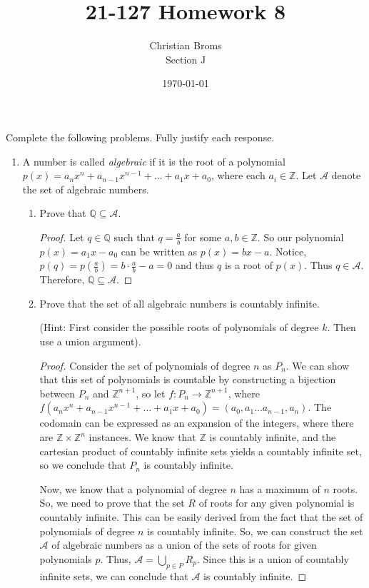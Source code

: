 \documentclass[12pt]{article}
\newcommand{\Z}{\mathbb{Z}}
\newcommand{\Q}{\mathbb{Q}}
\begin{document}
\title{21-127 Homework 8
}
\author{Christian Broms \\ Section J}
\date{\today}
\maketitle
Complete the following problems. Fully justify each response.


\begin{enumerate}

\item A number is called {\it algebraic} if it is the root of a polynomial $p(x)=a_nx^n+a_{n-1}x^{n-1}+\dots+a_1x+a_0$, where each $a_i\in \Z$. Let $\mathcal{A}$ denote the set of algebraic numbers.
\begin{enumerate}
\item Prove that $\Q\subseteq\mathcal{A}$.

\begin{proof}
Let $q \in \Q$ such that $q = \frac{a}{b}$ for some $a, b \in \Z$. So our polynomial $p(x) = a_1x - a_0$ can be written as $p(x) = bx - a$. Notice, $p(q) = p(\frac{a}{b}) = b \cdot \frac{a}{b} - a = 0$ and thus $q$ is a root of $p(x)$. Thus $q \in \mathcal{A}$. Therefore, $\Q\subseteq\mathcal{A}$. 
\end{proof}
\item Prove that the set of all algebraic numbers is countably infinite.

(Hint: First consider the possible roots of polynomials of degree $k$. Then use a union argument).

\begin{proof}
Consider the set of polynomials of degree $n$ as $P_n$. We can show that this set of polynomials is countable by constructing a bijection between $P_n$ and $\Z^{n + 1}$, so let $f:P_n \to \Z^{n + 1}$, where $f(a_nx^n+a_{n-1}x^{n-1}+\dots+a_1x+a_0) = (a_0, a_1 \dots a_{n-1}, a_n)$. The codomain can be expressed as an expansion of the integers, where there are $\Z \times \Z^n$ instances. We know that $\Z$ is countably infinite, and the cartesian product of countably infinite sets yields a countably infinite set, so we conclude that $P_n$ is countably infinite. 

Now, we know that a polynomial of degree $n$ has a maximum of $n$ roots. So, we need to prove that the set $R$ of roots for any given polynomial is countably infinite. This can be easily derived from the fact that the set of polynomials of degree $n$ is countably infinite. So, we can construct the set $\mathcal{A}$ of algebraic numbers as a union of the sets of roots for given polynomials $p$. Thus, $\mathcal{A} = \bigcup\limits_{p \in P}^{} R_p$. Since this is a union of countably infinite sets, we can conclude that $\mathcal{A}$ is countably infinite. 
\end{proof}


\end{enumerate}
\end{enumerate}
\end{document}
